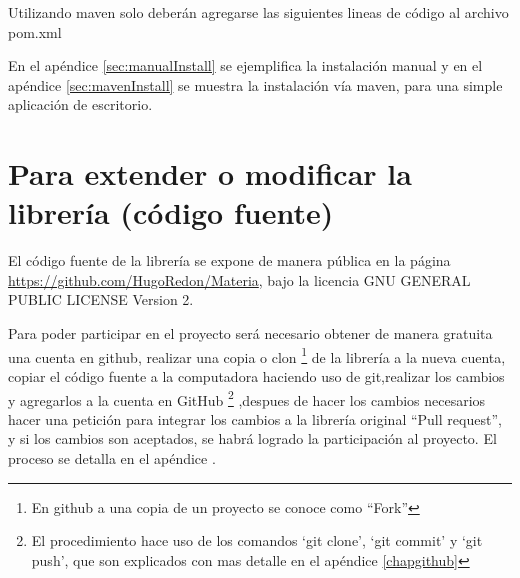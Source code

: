    Utilizando maven solo deberán agregarse las siguientes lineas de código al archivo pom.xml

    

    En el apéndice \ref{sec:manualInstall} se ejemplifica la instalación manual y en el apéndice \ref{sec:mavenInstall} se muestra la instalación vía maven, para una simple aplicación de escritorio.


  \section{Para extender o modificar la librería (código fuente)}

    El código fuente de la librería se expone de manera pública en la página \url{https://github.com/HugoRedon/Materia}, bajo la licencia GNU GENERAL PUBLIC LICENSE Version 2.
  
    Para poder participar en el proyecto será necesario obtener de manera gratuita una cuenta en github, realizar una copia o clon \footnote{En github a una copia de un proyecto se conoce como ``Fork''} de la librería  a la nueva cuenta, copiar el código fuente a la computadora haciendo uso de git,realizar los cambios y agregarlos a la cuenta en GitHub  \footnote{El procedimiento hace uso de los comandos `git clone', `git commit' y `git push', que son explicados con mas detalle en el apéndice \ref{chapgithub}} ,despues de hacer los cambios necesarios hacer una petición para integrar los cambios a la librería original ``Pull request'', y si los cambios son aceptados, se habrá logrado la participación al proyecto. El proceso se detalla en el apéndice .




